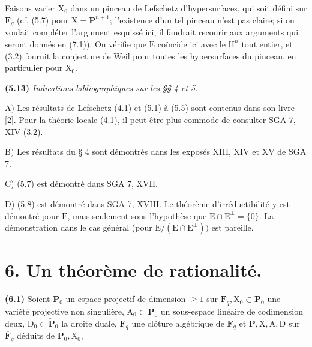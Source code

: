 \documentclass[10pt,leqno]{article}
\begin{document}
\noindent Faisons varier \(\mathrm{X}_{0}\) dans un pinceau de Lefschetz d’hypersurfaces, qui soit défini sur \(\mathbf{F}_{q}\) (cf. (5.7) pour \(\mathrm{X}=\mathbf{P}^{n+1}\); l’existence d’un tel pinceau n’est pas claire; si on voulait compléter l’argument esquissé ici, il faudrait recourir aux arguments qui seront donnés en (7.1)). On vérifie que \(\mathrm{E}\) coïncide ici avec le \(\mathrm{H}^{n}\) tout entier, et (3.2) fournit la conjecture de Weil pour toutes les hypersurfaces du pinceau, en particulier pour \(\mathrm{X}_{0}\).\par

\noindent \textbf{(5.13)} \emph{Indications bibliographiques sur les §§ 4 et 5.}\par

\noindent \(\mathrm{A})\) Les résultats de Lefschetz (4.1) et (5.1) à (5.5) sont contenus dans son livre [2]. Pour la théorie locale (4.1), il peut être plus commode de consulter SGA 7, XIV (3.2).\par

\noindent \(\mathrm{B})\) Les résultats du § 4 sont démontrés dans les exposés XIII, XIV et XV de SGA 7.\par

\noindent C) (5.7) est démontré dans SGA 7, XVII.\par

\noindent D) (5.8) est démontré dans SGA 7, XVIII. Le théorème d’irréductibilité y est démontré pour \(\mathrm{E}\), mais seulement sous l’hypothèse que \(\mathrm{E}\cap \mathrm{E}^{\perp }=\{0\}\). La démonstration dans le cas général (pour \(\mathrm{E}/(\mathrm{E}\cap \mathrm{E}^{\perp }))\) est pareille.\par

\section*{6. Un théorème de rationalité.}

\noindent \textbf{(6.1)} Soient \(\mathbf{P}_{0}\) un espace projectif de dimension \(\geq 1\) sur \(\mathbf{F}_{q}, \mathrm{X}_{0}\subset \mathbf{P}_{0}\) une variété projective non singulière, \(\mathrm{A}_{0}\subset \mathbf{P}_{0}\) un sous-espace linéaire de codimension deux, \(\mathrm{D}_{0}\subset \check{\mathbf{P}}_{0}\) la droite duale, \(\overline{\mathbf{F}}_{q}\) une clôture algébrique de \(\mathbf{F}_{q}\) et \(\mathbf{P}, \mathrm{X}, \mathrm{A}, \mathrm{D}\) sur \(\overline{\mathbf{F}}_{q}\) déduits de \(\mathbf{P}_{0}, \mathrm{X}_{0}\),\par
\end{document}
